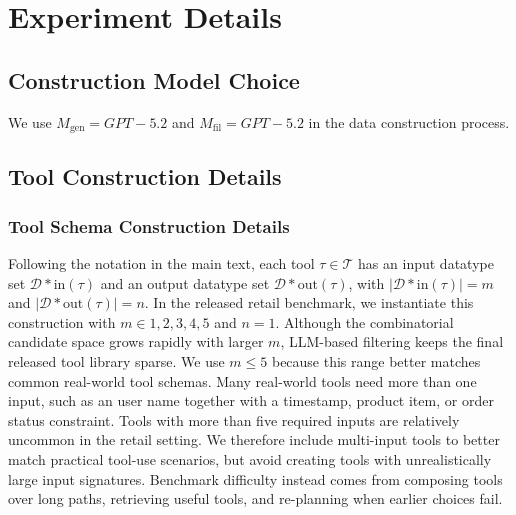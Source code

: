 \section{Experiment Details}
\label{app:experiment-details}

\subsection{Construction Model Choice}
\label{app:model-choice}

We use $M_{\mathrm{gen}}=GPT-5.2$ and $M_{\mathrm{fil}}=GPT-5.2$ in the data construction process.

\subsection{Tool Construction Details}
\label{app:tool-construction-details}

\subsubsection{Tool Schema Construction Details}
\label{app:schema-construction-details}

Following the notation in the main text, each tool $\tau \in \mathcal{T}$ has an input datatype set $\mathcal{D}*{\mathrm{in}}(\tau)$ and an output datatype set $\mathcal{D}*{\mathrm{out}}(\tau)$, with $|\mathcal{D}*{\mathrm{in}}(\tau)|=m$ and $|\mathcal{D}*{\mathrm{out}}(\tau)|=n$.
In the released retail benchmark, we instantiate this construction with $m\in{1,2,3,4,5}$ and $n=1$.
Although the combinatorial candidate space grows rapidly with larger $m$, LLM-based filtering keeps the final released tool library sparse.
We use $m\leq 5$ because this range better matches common real-world tool schemas.
Many real-world tools need more than one input, such as an user name together with a timestamp, product item, or order status constraint.
Tools with more than five required inputs are relatively uncommon in the retail setting.
We therefore include multi-input tools to better match practical tool-use scenarios, but avoid creating tools with unrealistically large input signatures.
Benchmark difficulty instead comes from composing tools over long paths, retrieving useful tools, and re-planning when earlier choices fail.

